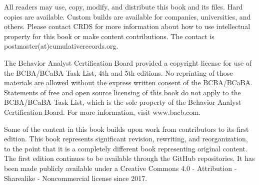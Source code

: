 All readers may use, copy, modify, and distribute this book and its files. Hard copies are available. Custom builds are available for companies, universities, and others. Please contact CRDS for more information about how to use intellectual property for this book or make content contributions. The contact is postmaster(at)cumulativerecords.org.

The Behavior Analyst Certification Board provided a copyright license for use of the BCBA/BCaBA Task List, 4th and 5th editions. No reprinting of those materials are allowed without the express written consent of the BCBA/BCaBA. Statements of free and open source licensing of this book do not apply to the BCBA/BCaBA Task List, which is the sole property of the Behavior Analyst Certification Board. For more information, visit www.bacb.com.

Some of the content in this book builds upon work from contributors to its first edition. This book represents significant revision, rewriting, and reorganization, to the point that it is a completely different book representing original content. The first edition continues to be available through the GitHub repositories. It has been made publicly available under a Creative Commons 4.0 - Attribution - Sharealike - Noncommercial license since 2017.
\clearpage
